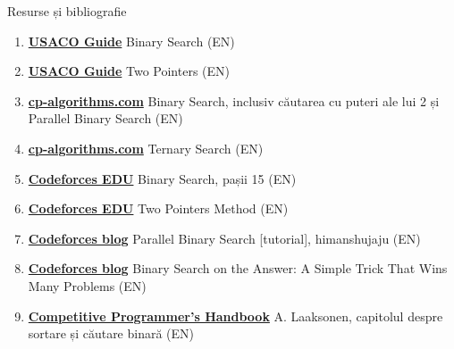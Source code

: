 \documentclass[8pt,mathserif]{beamer}
\begin{document}
\begin{frame}{Resurse și bibliografie}
  \begin{enumerate}
    \item \href{https://usaco.guide/silver/binary-search}{\textbf{USACO Guide}} \textemdash{} Binary Search (EN)
    \item \href{https://usaco.guide/silver/two-pointers}{\textbf{USACO Guide}} \textemdash{} Two Pointers (EN)
    \item \href{https://cp-algorithms.com/num_methods/binary_search.html}{\textbf{cp-algorithms.com}} \textemdash{} Binary Search, inclusiv căutarea cu puteri ale lui 2 și Parallel Binary Search (EN)
    \item \href{https://cp-algorithms.com/num_methods/ternary_search.html}{\textbf{cp-algorithms.com}} \textemdash{} Ternary Search (EN)
    \item \href{https://codeforces.com/edu/course/2/lesson/6/1/practice}{\textbf{Codeforces EDU}} \textemdash{} Binary Search, pașii 1\textendash{}5 (EN)
    \item \href{https://codeforces.com/edu/course/2/lesson/9}{\textbf{Codeforces EDU}} \textemdash{} Two Pointers Method (EN)
    \item \href{https://codeforces.com/blog/entry/45578}{\textbf{Codeforces blog}} \textemdash{} Parallel Binary Search [tutorial], himanshujaju (EN)
    \item \href{https://codeforces.com/blog/entry/143038}{\textbf{Codeforces blog}} \textemdash{} Binary Search on the Answer: A Simple Trick That Wins Many Problems (EN)
    \item \href{https://cses.fi/book/book.pdf}{\textbf{Competitive Programmer's Handbook}} \textemdash{} A. Laaksonen, capitolul despre sortare și căutare binară (EN)
  \end{enumerate}
\end{frame}
\end{document}
